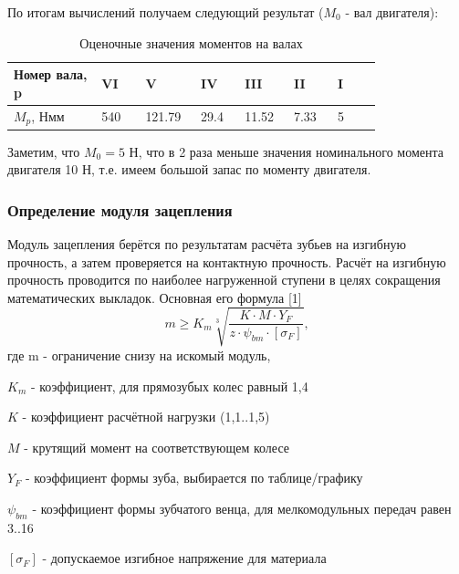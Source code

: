 \documentclass[14pt,a4paper,russian]{scrartcl}
\begin{document}
        По итогам вычислений получаем следующий результат (\( M_0 \) - вал двигателя):
        \begin{table}[h!]
            \begin{center}
                \begin{tabular}{p{0.2\linewidth}p{0.1\linewidth}p{0.1\linewidth}p{0.1\linewidth}p{0.1\linewidth}p{0.1\linewidth}p{0.1\linewidth}}
                    \hline
                    Номер вала, p & VI & V & IV & III & II & I \\
                    \hline
                    \( M_p \), Нмм & 540 & 121.79 & 29.4 & 11.52 & 7.33 & 5 \\
                    \hline
                \end{tabular}
                \caption{Оценочные значения моментов на валах}\label{tab:moments__shaft_estimate}
            \end{center}
        \end{table}

        Заметим, что \( M_0=5 \) Н, что в 2 раза меньше значения номинального момента двигателя 10 Н,
        т.е. имеем большой запас по моменту двигателя.

    \subsubsection{Определение модуля зацепления}
        Модуль зацепления берётся по результатам расчёта зубьев на изгибную прочность, а затем проверяется
        на контактную прочность. Расчёт на изгибную прочность проводится по наиболее нагруженной ступени в целях
        сокращения математических выкладок. Основная его формула [1]
        \[ m \geq K_m\sqrt[3]{\frac{K\cdot M\cdot Y_F}{z\cdot\psi_{bm}\cdot[\sigma_F]}}, \]
        где m - ограничение снизу на искомый модуль,\par
            \( K_m \) - коэффициент, для прямозубых колес равный 1,4\par 
            \( K \) - коэффициент расчётной нагрузки (1,1..1,5)\par
            \( M \) - крутящий момент на соответствующем колесе\par
            \( Y_F \) - коэффициент формы зуба, выбирается по таблице/графику\par
            \( \psi_{bm} \) - коэффициент формы зубчатого венца, для мелкомодульных передач равен 3..16\par
            \( [\sigma_F] \) - допускаемое изгибное напряжение для материала\par
        
\end{document}
